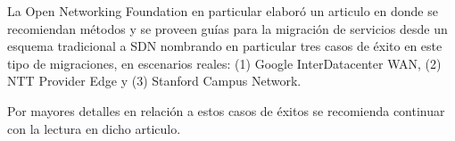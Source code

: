 La Open Networking Foundation en particular elabor\'o un articulo\cite{ONFSuccessCase} en donde se recomiendan métodos y se proveen guías para la migración de servicios desde un esquema tradicional a SDN nombrando en particular tres casos de éxito en este tipo de migraciones, en escenarios reales: (1) Google InterDatacenter WAN, (2) NTT Provider Edge y (3) Stanford Campus Network.

Por mayores detalles en relación a estos casos de \'exitos se recomienda continuar con la lectura en dicho articulo.





 

